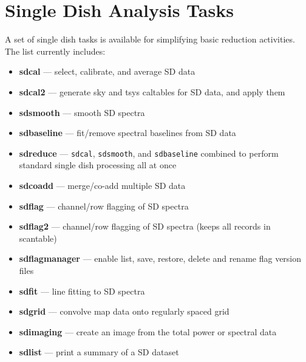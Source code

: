 

\section{Single Dish Analysis Tasks}
\label{section:sd.sdtasks}

A set of single dish tasks is available for simplifying basic
reduction activities.  The list currently includes:

\begin{itemize}
 
\item {\bf sdcal} --- select, calibrate, and average SD data

\item {\bf sdcal2} --- generate sky and tsys caltables for SD data, and apply them 

\item {\bf sdsmooth} --- smooth SD spectra

\item {\bf sdbaseline} --- fit/remove spectral baselines from SD data

\item {\bf sdreduce} --- {\tt sdcal}, {\tt sdsmooth}, and {\tt sdbaseline} combined to perform standard single dish processing all at once 

\item {\bf sdcoadd} --- merge/co-add multiple SD data

\item {\bf sdflag} --- channel/row flagging of SD spectra

\item {\bf sdflag2} --- channel/row flagging of SD spectra (keeps all records in scantable)

\item {\bf sdflagmanager} --- enable list, save, restore, delete and rename flag version files

\item {\bf sdfit} --- line fitting to SD spectra

\item {\bf sdgrid} --- convolve map data onto regularly spaced grid

\item {\bf sdimaging} --- create an image from the total power or spectral data

\item {\bf sdlist} --- print a summary of a SD dataset


\end{itemize}

